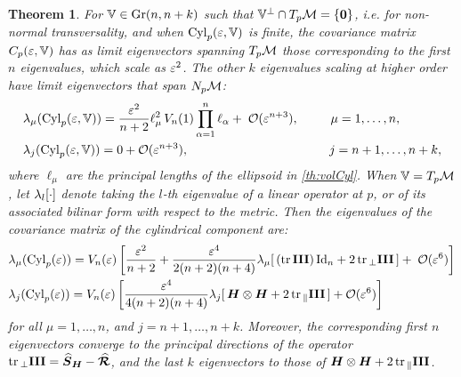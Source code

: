 \documentclass[letterpaper, reqno, 11pt]{amsart}
\newtheorem{theorem}{Theorem}[section]
\theoremstyle{definition}
\theoremstyle{remark}
\numberwithin{equation}{section}
\begin{document}
\begin{theorem}\label{MainTh}
	 For $\mathbb{V}\in\mathrm{Gr}({n},{n+k})$ such that $\mathbb{V}^\perp\cap T_p{\mathcal M}=\{\boldsymbol{0}\}$, i.e. for non-normal transversality, and when $\mathrm{Cyl}_p(\varepsilon,\mathbb{V})$ is finite, the covariance matrix $C_p(\varepsilon,\mathbb{V})$ has as limit eigenvectors spanning $T_p{\mathcal M}$ those corresponding to the first $n$ eigenvalues, which scale as $\varepsilon^2$. The other $k$ eigenvalues scaling at higher order have limit eigenvectors that span $N_p{\mathcal M}$:
		\begin{align}
			& \lambda_\mu (\mathrm{Cyl}_p(\varepsilon,\mathbb{V})) =\frac{\varepsilon^2}{n+2}\ell^2_\mu\, V_n(1)\prod_{\alpha=1}^n \ell_\alpha+\;{\mathcal O}(\varepsilon^{n+3}),\quad\quad\;\; \mu=1,\dots, n, \\
			& \lambda_j (\mathrm{Cyl}_p(\varepsilon,\mathbb{V})) = 0+{\mathcal O}(\varepsilon^{n+3}),\qquad\quad\qquad\quad\qquad\quad\qquad\; j=n+1,\dots, n+k,
		\end{align}
		where $\ell_\mu$ are the \emph{principal lengths} of the ellipsoid in \ref{th:volCyl}. When $\mathbb{V}=T_p{\mathcal M}$, let $\lambda_l[\cdot]$ denote taking the $l$-th eigenvalue of a linear operator at $p$, or of its associated bilinar form with respect to the metric. Then the eigenvalues of the covariance matrix of the cylindrical component are:
\begin{align}\label{eq:tanEVDCyl}
		&  \lambda_\mu (\mathrm{Cyl}_p(\varepsilon)) =V_n(\varepsilon)\left[\frac{\varepsilon^2}{n+2}+\frac{\varepsilon^4}{2(n+2)(n+4)}\lambda_\mu[\,(\mathrm{tr}\,\boldsymbol{\mathrm{III}} )\,\mathrm{Id}_n +2\,\mathrm{tr}\,_\perp\boldsymbol{\mathrm{III}}\,] +\;{\mathcal O}(\varepsilon^6)\right] \\
& \lambda_j (\mathrm{Cyl}_p(\varepsilon)) =V_n(\varepsilon)\left[\frac{\varepsilon^4}{4(n+2)(n+4)} \lambda_j[\,\boldsymbol{H}\otimes\boldsymbol{H} + 2\,\mathrm{tr}\,_\parallel\boldsymbol{\mathrm{III}}\,] +{\mathcal O}(\varepsilon^6)\right] \label{eq:norEVDCyl}
\end{align}
for all $\mu=1,\dots, n$, and $j=n+1,\dots, n+k$. Moreover, the corresponding first $n$ eigenvectors converge to the principal directions of the operator $\mathrm{tr}\,_\perp\boldsymbol{\mathrm{III}} =\boldsymbol{\widehat{S}}_{\boldsymbol{H}}-\boldsymbol{\widehat{\mathcal{R}}}$, and the last $k$ eigenvectors to those of $\boldsymbol{H}\otimes\boldsymbol{H} + 2\,\mathrm{tr}\,_\parallel\boldsymbol{\mathrm{III}}$.
\end{theorem}
\end{document}
